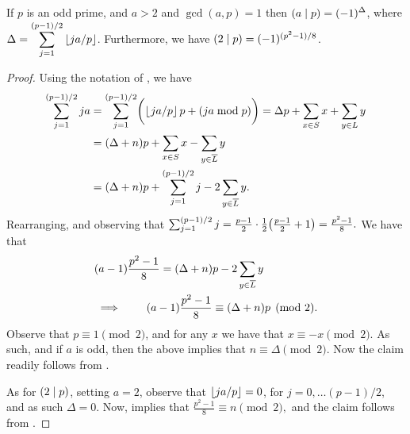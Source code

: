 \begin{lemma}
    If $p$ is an odd prime, and $a>2$ and $\gcd(a, p)=1$ then
    $\left( \displaystyle {a}\mid{p} \right) = \displaystyle (-1)^\Delta$, where $\displaystyle \Delta =
    \sum_{j=1}^{(p-1)/2} \left\lfloor {j a / p} \right\rfloor$.  Furthermore, we have
    $\left( \displaystyle {2}\mid{p} \right) = (-1)^{(p^2 - 1)/8}$.
\end{lemma}
\begin{proof}
    Using the notation of , we have
    \begin{align*}
        \sum_{j=1}^{(p-1)/2} j a %
        &=%
        \sum_{j=1}^{(p-1)/2} \pth{\biggl.\floor{\ts j a / p}p + (ja
           \bmod p)}%
        =%
        \Delta p + \sum_{x \in S} x + \sum_{y \in L} y\\
        &=%
        (\Delta+n) p + \sum_{x \in S} x - \sum_{y \in \overline{L}} y\\
        &=%
        (\Delta+n) p + \sum_{j=1}^{(p-1)/2} j - 2\sum_{y \in
           \overline{L}} y.%
    \end{align*}
    Rearranging, and observing that 
    \begin{math}
        \sum_{j=1}^{(p-1)/2} j%
        = \frac{p-1}{2}\cdot \frac{1}{2}\pth[]{\bigl. \frac{p-1}{2}
           +1} = \frac{p^2-1}{8}.
    \end{math}
     We have that 
     \begin{align}
         &(a-1) \frac{p^2-1}{8} = (\Delta+n) p - 2\sum_{y \in
            \overline{L}} y\nonumber\\
         &\implies \qquad %
         (a-1) \frac{p^2-1}{8} \equiv (\Delta+n) p \pmod{2}.%
         \eqlab{a:m:one}
     \end{align}
     Observe that $p \equiv 1 \pmod{2}$, and for any $x$ we have that
     $x \equiv -x \pmod{2}$.  As such, and if $a$ is odd, then the
     above implies that $n \equiv \Delta \pmod{2}$. Now the claim
     readily follows from .

     As for $\left( \displaystyle {2}\mid{p} \right)$, setting $a=2$, observe that $\left\lfloor {j a /
        p} \right\rfloor = 0$, for $j=0,\ldots (p-1)/2$, and as such $\Delta=0$.
     Now,  implies that
     \begin{math}
         \frac{p^2-1}{8} \equiv n \pmod{2},
     \end{math}
     and the claim follows from .
\end{proof}




